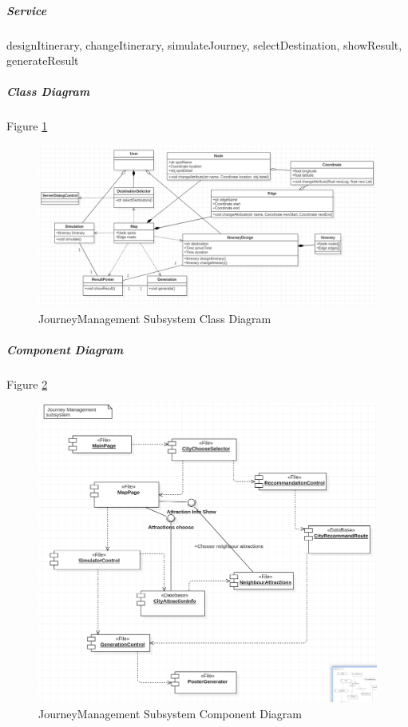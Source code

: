 \documentclass[10pt]{article}
\begin{document}
\subparagraph{Service}  designItinerary, changeItinerary, simulateJourney, selectDestination, showResult, generateResult

\subparagraph{Class Diagram} Figure \ref{JourneyManagement Subsystem Class Diagram}

\begin{figure}[H]
	\centering
	
	\includegraphics[width=14cm]{journeyclass.png}
	\caption{JourneyManagement Subsystem Class Diagram}
	\label{JourneyManagement Subsystem Class Diagram}
\end{figure}

\subparagraph{Component Diagram} Figure \ref{JourneyManagement Subsystem Component Diagram}

\begin{figure}[H]
	\centering
	
	\includegraphics[width=14cm]{journeycom.png}
	\caption{JourneyManagement Subsystem Component Diagram}
	\label{JourneyManagement Subsystem Component Diagram}
\end{figure}
\end{document}
